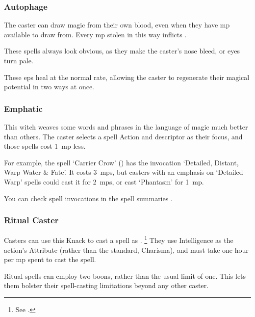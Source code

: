\begin{multicols}{2}


\subsubsection{Autophage}

The caster can draw magic from their own blood, even when they have \gls{mp} available to draw from.
Every \gls{mp} stolen in this way inflicts .

These spells always look obvious, as they make the caster's nose bleed, or eyes turn pale.

These \glspl{ep} heal at the normal rate, allowing the caster to regenerate their magical potential in two ways at once.

\subsubsection{Emphatic}
\label{emphaticCaster}

This \gls{witch} weaves some words and phrases in the language of magic much better than others.
The caster selects a spell Action and \gls{descriptor} as their focus, and those spells cost 1~\gls{mp} less.

For example, the spell `Carrier Crow' () has the invocation `Detailed, Distant, Warp Water \& Fate'.
It costs 3~\glspl{mp}, but casters with an emphasis on `Detailed Warp' spells could cast it for 2~\glspl{mp}, or cast `Phantasm' for 1~\gls{mp}.

You can check spell \glspl{invocation} in the spell summaries .

\subsubsection{Ritual Caster}
\label{ritualCaster}

Casters can use this Knack to cast a spell as .%
\footnote{See .}
They use Intelligence as the action's Attribute (rather than the standard, Charisma), and must take one hour per \gls{mp} spent to cast the spell.

Ritual spells can employ two \glspl{boon}, rather than the usual limit of one.
This lets them bolster their spell-casting limitations beyond any other caster.


\end{multicols}
